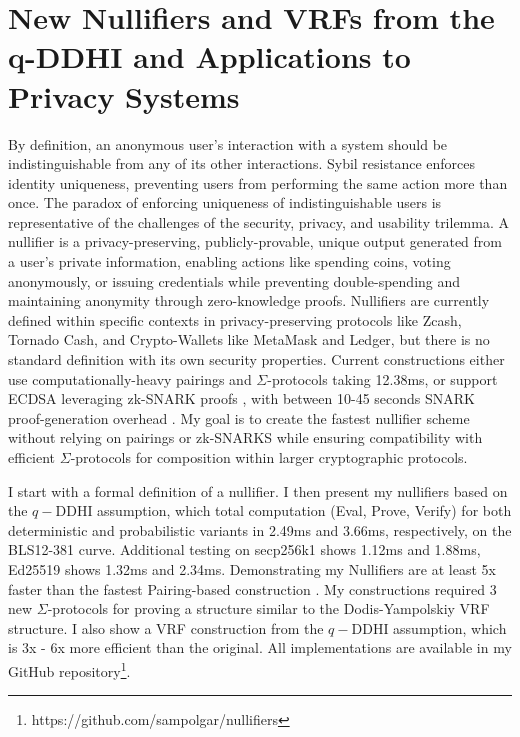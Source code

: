 \chapter{New Nullifiers and VRFs from the q-DDHI and Applications to Privacy Systems}\label{chap4}
By definition, an anonymous user's interaction with a system should be indistinguishable from any of its other interactions. Sybil resistance enforces identity uniqueness, preventing users from performing the same action more than once. The paradox of enforcing uniqueness of indistinguishable users is representative of the challenges of the security, privacy, and usability trilemma. A nullifier is a privacy-preserving, publicly-provable, unique output generated from a user's private information, enabling actions like spending coins, voting anonymously, or issuing credentials while preventing double-spending and maintaining anonymity through zero-knowledge proofs. Nullifiers are currently defined within specific contexts in privacy-preserving protocols like Zcash, Tornado Cash, and Crypto-Wallets like MetaMask and Ledger, but there is no standard definition with its own security properties. Current constructions either use computationally-heavy pairings and $\Sigma$-protocols \cite{tomescu_utt_2022} taking 12.38ms, or support ECDSA leveraging zk-SNARK proofs \cite{ben_sasson_zerocash_2014, gupta_plume_2022}, with between 10-45 seconds SNARK proof-generation overhead \cite{distributed_lab_-_noir_noir-plumebenchmarkmd_2024}. My goal is to create the fastest nullifier scheme without relying on pairings or zk-SNARKS while ensuring compatibility with efficient $\Sigma$-protocols for composition within larger cryptographic protocols.

I start with a formal definition of a nullifier. I then present my nullifiers based on the $q-$DDHI assumption, which total computation (Eval, Prove, Verify) for both deterministic and probabilistic variants in 2.49ms and 3.66ms, respectively, on the BLS12-381 curve. Additional testing on secp256k1 shows 1.12ms and 1.88ms, Ed25519 shows 1.32ms and 2.34ms. Demonstrating my Nullifiers are at least 5x faster than the fastest Pairing-based construction \cite{tomescu_utt_2022}. My constructions required 3 new $\Sigma$-protocols for proving a structure similar to the Dodis-Yampolskiy VRF structure. I also show a VRF construction from the $q-$DDHI assumption, which is 3x - 6x more efficient than the original. All implementations are available in my GitHub repository\footnote{https://github.com/sampolgar/nullifiers}.

